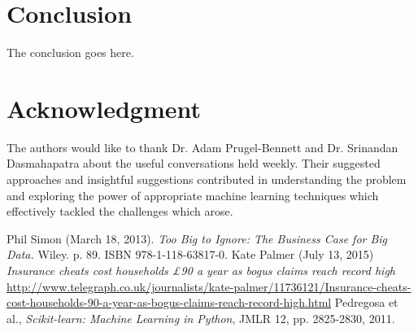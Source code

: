 \documentclass[conference, onecolumn]{IEEEtran}
\begin{document}
%



\section{Conclusion}
The conclusion goes here.






\section*{Acknowledgment}

The authors would like to thank Dr. Adam Prugel-Bennett and Dr. Srinandan Dasmahapatra about the useful conversations held weekly. Their suggested approaches and insightful suggestions contributed in understanding the problem and exploring the power of appropriate machine learning techniques which effectively tackled the challenges which arose.


\begin{thebibliography}{99}
 Phil Simon (March 18, 2013). \emph{Too Big to Ignore: The Business Case for Big Data.} Wiley. p. 89. ISBN 978-1-118-63817-0.
 Kate Palmer (July 13, 2015)  \emph{Insurance cheats cost households £90 a year as bogus claims reach record high}\\
\url{http://www.telegraph.co.uk/journalists/kate-palmer/11736121/Insurance-cheats-cost-households-90-a-year-as-bogus-claims-reach-record-high.html}
 Pedregosa et al., \emph{Scikit-learn: Machine Learning in Python},  JMLR 12, pp. 2825-2830, 2011.


\end{thebibliography}
\end{document}
